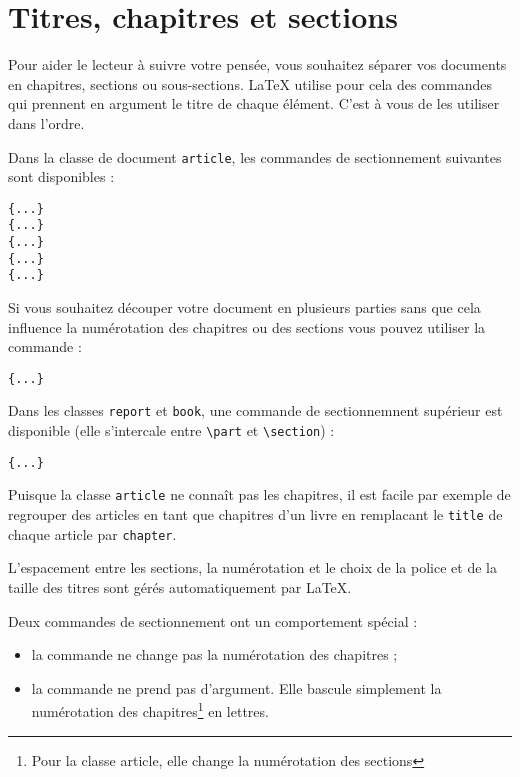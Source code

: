 \section{Titres, chapitres et sections}

Pour aider le lecteur à suivre votre pensée, vous souhaitez séparer
vos documents en chapitres, sections ou sous-sections. \LaTeX{}
utilise pour cela des commandes qui prennent en argument le titre de
chaque élément. C'est à vous de les utiliser dans l'ordre.

Dans la classe de document \texttt{article}, les commandes de
sectionnement suivantes sont disponibles : \nopagebreak
\begin{lscommand}
\verb|{...}|\\
\verb|{...}|\\
\verb|{...}|\\
\verb|{...}|\\
\verb|{...}|
\end{lscommand}

Si vous souhaitez découper votre document en plusieurs parties sans que cela influence la
numérotation des chapitres ou des sections vous pouvez utiliser la
commande :
\begin{lscommand}
\verb|{...}|
\end{lscommand}

Dans les classes \texttt{report} et \texttt{book}, une commande de
sectionnemnent supérieur est disponible (elle s'intercale
entre \verb|\part| et \verb|\section|) :
\begin{lscommand}
\verb|{...}|
\end{lscommand}

Puisque la classe \texttt{article} ne connaît pas les chapitres, il
est facile par exemple de regrouper des articles en tant que chapitres
d'un livre en remplacant le \texttt{\bs title} de chaque article par
\texttt{\bs chapter}.

L'espacement entre les sections, la numérotation et le
choix de la police et de la taille des titres sont gérés
automatiquement par \LaTeX{}.

Deux commandes de sectionnement ont un comportement spécial :
\begin{itemize}
\item la commande  ne change pas la numérotation des
      chapitres ;
\item la commande  ne prend pas d'argument. Elle bascule
      simplement la numérotation des chapitres\footnote{Pour la classe
      article, elle change la numérotation des sections} en lettres.
\end{itemize}

